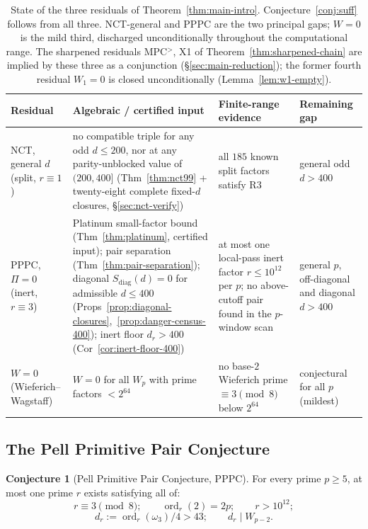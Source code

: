 \documentclass[11pt]{amsart}
\theoremstyle{plain}
\theoremstyle{definition}
\newtheorem{conjecture}[theorem]{Conjecture}
\theoremstyle{remark}
\numberwithin{equation}{section}
\newcommand{\ord}{\operatorname{ord}}
\begin{document}
\begin{table}[ht]
\centering
\footnotesize
\renewcommand{\arraystretch}{1.25}
\begin{tabular}{@{}p{2.45cm}p{3.05cm}p{4.15cm}p{2.2cm}@{}}
\hline
Residual & Algebraic / certified input & Finite-range evidence & Remaining gap \\
\hline
NCT, general $d$ \newline (split, $r \equiv 1$) & no compatible triple for any odd $d \leq 200$, nor at any parity-unblocked value of $(200, 400]$ (Thm~\ref{thm:nct99} + twenty-eight complete fixed-$d$ closures, \S\ref{sec:nct-verify}) & all $185$ known split factors satisfy R3 & general odd $d > 400$ \\
PPPC, $\Pi = 0$ \newline (inert, $r \equiv 3$) & Platinum small-factor bound (Thm~\ref{thm:platinum}, certified input); pair separation (Thm~\ref{thm:pair-separation}); diagonal $S_{\mathrm{diag}}(d) = 0$ for admissible $d \leq 400$ (Props~\ref{prop:diagonal-closures},~\ref{prop:danger-census-400}); inert floor $d_r > 400$ (Cor~\ref{cor:inert-floor-400}) & at most one local-pass inert factor $r \leq 10^{12}$ per $p$; no above-cutoff pair found in the $p$-window scan & general $p$, off-diagonal and diagonal $d > 400$ \\
$W = 0$ \newline (Wieferich--Wagstaff) & $W = 0$ for all $W_p$ with prime factors $< 2^{64}$ & no base-$2$ Wieferich prime $\equiv 3 \pmod 8$ below $2^{64}$ & conjectural for all $p$ (mildest) \\
\hline
\end{tabular}
\caption{State of the three residuals of Theorem~\ref{thm:main-intro}. Conjecture~\ref{conj:suff} follows from all three. NCT-general and PPPC are the two principal gaps; $W = 0$ is the mild third, discharged unconditionally throughout the computational range. The sharpened residuals MPC$^{>}$, X1 of Theorem~\ref{thm:sharpened-chain} are implied by these three as a conjunction (\S\ref{sec:main-reduction}); the former fourth residual $W_1 = 0$ is closed unconditionally (Lemma~\ref{lem:w1-empty}).}
\label{tab:status}
\end{table}

\subsection{The Pell Primitive Pair Conjecture}\label{sec:pppc-statement}

\begin{conjecture}[Pell Primitive Pair Conjecture, PPPC]\label{conj:pppc-intro}
For every prime $p \geq 5$, at most one prime $r$ exists satisfying all of:
\[
  r \equiv 3 \pmod 8; \qquad \ord_r(2) = 2 p; \qquad r > 10^{12};
\]
\[
  d_r := \ord_r(\omega_3)/4 > 43; \qquad d_r \mid W_{p-2}.
\]
\end{conjecture}
\end{document}
